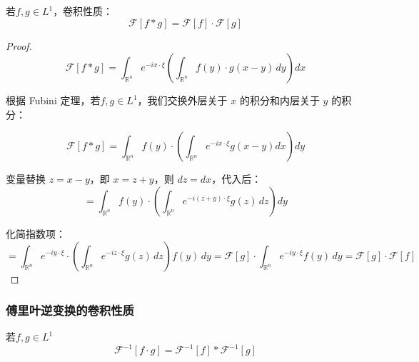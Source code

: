 \documentclass[12pt,a4paper]{article}
\numberwithin{subsection}{section}   %
\numberwithin{subsubsection}{subsection}
\theoremstyle{plain}
\theoremstyle{definition}
\theoremstyle{remark}
\theoremstyle{remark}
\begin{document}
	若\( f,g \in L^1 \)，卷积性质：
	\begin{equation}
		\mathcal{F}[f * g] = \mathcal{F}[f] \cdot \mathcal{F}[g]
	\end{equation}


		\begin{proof}
	\[	
		\mathcal{F}[f * g] = \int_{\mathbb{R}^n} e^{-i x \cdot \xi} \left( \int_{\mathbb{R}^n} f(y) \cdot g(x - y) \, dy \right) dx
	\]	
	
	
	根据 Fubini 定理，若\( f,g \in L^1 \)，我们交换外层关于 \(x\) 的积分和内层关于 \(y\) 的积分：
	
	\[
	\mathcal{F}[f * g] = \int_{\mathbb{R}^n} f(y) \cdot \left( \int_{\mathbb{R}^n} e^{-i x \cdot \xi} g(x - y) dx \right) dy
	\]
	
	变量替换 \( z = x - y \)，即 \( x = z + y \)，则 \( dz = dx \)，代入后：
	\[	
		= \int_{\mathbb{R}^n} f(y) \cdot \left( \int_{\mathbb{R}^n} e^{-i (z + y) \cdot \xi} g(z) \, dz \right) dy
	\]	
	
	化简指数项：
		\[	
		= \int_{\mathbb{R}^n} e^{-i y \cdot \xi} \cdot \left( \int_{\mathbb{R}^n} e^{-i z \cdot \xi} g(z) \, dz \right) f(y) \, dy	= \mathcal{F}[g] \cdot \int_{\mathbb{R}^n} e^{-i y \cdot \xi} f(y) \, dy = \mathcal{F}[g] \cdot \mathcal{F}[f]
	\]	
	
	
\end{proof}
	
		\subsubsection{傅里叶逆变换的卷积性质}
	若\( f,g \in L^1 \)
	\begin{equation}\label{nibianhuanjuanji}
		\mathcal{F}^{-1}[f \cdot g] = \mathcal{F}^{-1}[f] * \mathcal{F}^{-1}[g]
	\end{equation}
	
\end{document}
